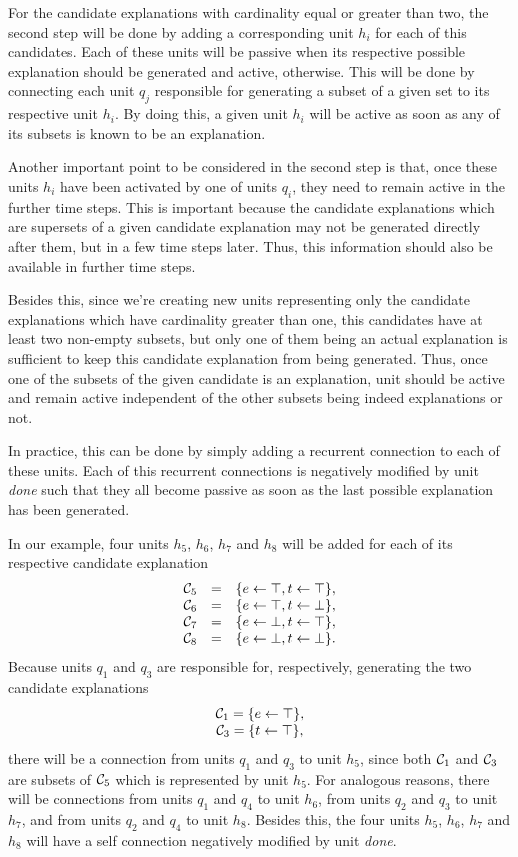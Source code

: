 For the candidate explanations with cardinality equal or greater than two, the second step will be done by adding a corresponding unit $h_i$ for each of this candidates. Each of these units will be passive when its respective possible explanation should be generated and active, otherwise. This will be done by connecting each unit $q_j$ responsible for generating a subset of a given set to its respective unit $h_i$. By doing this, a given unit $h_i$ will be active as soon as any of its subsets is known to be an explanation. 

Another important point to be considered in the second step is that, once these units $h_i$ have been activated by one of units $q_i$, they need to remain active in the further time steps. This is important because the candidate explanations which are supersets of a given candidate explanation may not be generated directly after them, but in a few time steps later. Thus, this information should also be available in further time steps. 

Besides this, since we're creating new units representing only the candidate explanations which have cardinality greater than one, this candidates have at least two non-empty subsets, but only one of them being an actual explanation is sufficient to keep this candidate explanation from being generated. Thus, once one of the subsets of the given candidate is an explanation, unit should be active and remain active independent of the other subsets being indeed explanations or not. 

In practice, this can be done by simply adding a recurrent connection to each of these units. Each of this recurrent connections is negatively modified by unit \textit{done} such that they all become passive as soon as the last possible explanation has been generated.

In our example, four units $h_5$, $h_6$, $h_7$ and $h_8$ will be added for each of its respective candidate explanation
\[
\begin{array}{ccc}
\mathcal{C}_5 &=& \{e \leftarrow \top, t \leftarrow \top\},\\
\mathcal{C}_6 &=& \{e \leftarrow \top, t \leftarrow \bot\}, \\
\mathcal{C}_7 &=& \{e \leftarrow \bot, t \leftarrow \top\}, \\
\mathcal{C}_8 &=& \{e \leftarrow \bot, t \leftarrow \bot\}.
\end{array}
\]
Because units $q_1$ and $q_3$ are responsible for, respectively, generating the two candidate explanations 
\[
\begin{array}{ccc}
\mathcal{C}_1 = \{e \leftarrow \top\}, \\
\mathcal{C}_3 = \{t \leftarrow \top\}, \\
\end{array}
\]
there will be a connection from units $q_1$ and $q_3$ to unit $h_5$, since both $\mathcal{C}_1$ and $\mathcal{C}_3$ are subsets of $\mathcal{C}_5$ which is represented by unit $h_5$. For analogous reasons, there will be connections from units $q_1$ and $q_4$ to unit $h_6$, from units $q_2$ and $q_3$ to unit $h_7$, and from units $q_2$ and $q_4$ to unit $h_8$. Besides this, the four units $h_5$, $h_6$, $h_7$ and $h_8$ will have a self connection negatively modified by unit \textit{done}.
 
